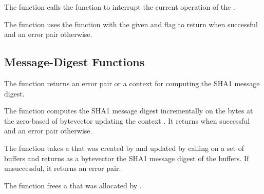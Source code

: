 \begin{function}
\end{function}

The  function calls the
 function to interrupt the current operation
of the .

\begin{function}
\end{function}

The  function uses the
 function with the given  and
 flag to return 
when successful and an error pair otherwise.

\subsection {Message-Digest Functions}

\begin{function}
\end{function}

The  function returns an error pair
or a context for computing the SHA1 message digest.

\begin{function}
\end{function}

The  function computes the SHA1 message digest
incrementally on the  bytes at the zero-based 
of bytevector  updating the context .
It returns  when successful and an error pair otherwise.

\begin{function}
\end{function}

The  function takes a  that was created by
 and updated by calling  on a set
of buffers and returns as a bytevector the SHA1 message digest of the buffers.
If unsuccessful, it returns an error pair.

\begin{function}
\end{function}

The  function frees a 
that was allocated by .
